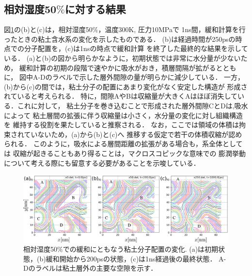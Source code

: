\subsection{相対湿度50$\%$に対する結果}
図\ref{fig:fig3}の(b)と(c)は，相対湿度50$\%$，温度300K, 圧力10MPaで
1ns間，緩和計算を行ったときの粘土含水系の変化を示したものである．
(b)は経過時間が250psの時点での分子配置を，(c)は1nsの時点で緩和計算
を終了した最終的な結果を示している．
(a)と(b)の図から明らかなように，初期状態では非常に水分量が少ないため，
緩和計算の初期の段階で速やかに吸水がおき，積層間隔が拡がるとともに，
図中A-Dのラベルで示した層外間隙の量が明らかに減少している．
一方，(b)から(c)の間では，粘土分子の配置にあまり変化がなく安定した構造が
形成されていると考えられる．
特に，間隙AやBは収縮量が大きくAはほぼ消失している．これに対して，
粘土分子を巻き込むことで形成された層外間隙CとDは,吸水によって
粘土層間の拡張に伴う収縮量は小さく，水分量の変化に対し組織構造を
維持する役割を果たしていると推察される．
なお，ここでは領域の体積は拘束されていないため，(a)から(b)と(c)へ
推移する仮定で若干の体積収縮が認められる．
このように，吸水による層間距離の拡張がある場合も，系全体としては
収縮が起きることもあり得ることは，マクロスコピックな意味での
膨潤挙動について考える際にも留意する必要があることを示唆している．
\begin{figure}[h]
	\begin{center}
	\includegraphics[width=1.0\linewidth]{Figs/fig3.pdf} 
	\end{center}
	\caption{
		相対湿度50$\%$での緩和にともなう粘土分子配置の変化.  
		(a)は初期状態，(b)緩和開始から200psの状態，(c)は1ns経過後の最終状態．
		A-Dのラベルは粘土層外の主要な空隙を示す．
	} 
	\label{fig:fig3}
\end{figure}

